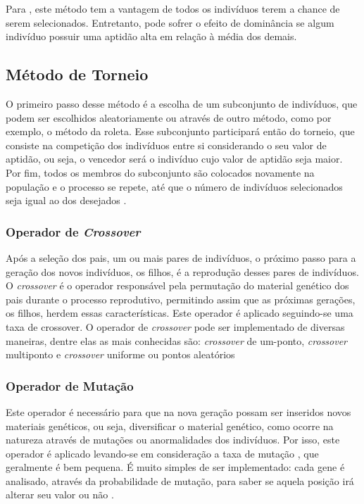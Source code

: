 Para \cite{mognon04}, este método tem a vantagem de todos os indivíduos terem a chance de serem selecionados.  Entretanto, pode sofrer o efeito de dominância se algum indivíduo possuir uma aptidão alta em relação à média dos demais. 


\subsection{Método de Torneio}


O primeiro passo desse método é a escolha de um subconjunto de indivíduos, que podem ser escolhidos aleatoriamente ou através de outro método, como por exemplo, o método da roleta. Esse subconjunto participará então do torneio, que consiste na competição dos indivíduos entre si considerando o seu valor de aptidão, ou seja, o vencedor será o indivíduo cujo valor de aptidão seja maior. Por fim, todos os membros do subconjunto são colocados novamente na população e o processo se repete, até que o número de indivíduos selecionados seja igual ao dos desejados \cite{mognon04}. 

\subsubsection{Operador de \textit{Crossover}}

Após a seleção dos pais, um ou mais pares de indivíduos, o próximo passo para a geração dos novos indivíduos, os filhos, é a reprodução desses pares de indivíduos. O \textit{crossover} é o operador responsável pela permutação do material genético dos pais durante o processo reprodutivo, permitindo assim que as próximas gerações, os filhos, herdem essas características. Este operador é aplicado seguindo-se uma taxa de crossover. O operador de \textit{crossover} pode ser implementado de diversas maneiras, dentre elas as mais conhecidas são: \textit{crossover} de um-ponto, \textit{crossover} multiponto e \textit{crossover} uniforme ou pontos aleatórios


\subsubsection{Operador de Mutação}
 
Este operador é necessário para que na nova geração possam ser inseridos novos materiais genéticos, ou seja, diversificar o material genético, como ocorre na natureza através de mutações ou anormalidades dos indivíduos. Por isso, este operador é aplicado levando-se em consideração a taxa de mutação , que geralmente é bem pequena. É muito simples de ser implementado: cada gene é analisado, através da probabilidade de mutação, para saber se aquela posição irá alterar seu valor ou não \cite{mognon04}.

